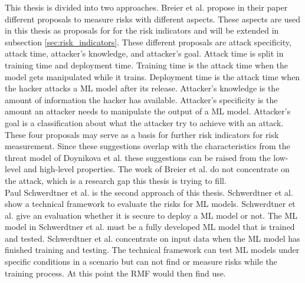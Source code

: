 This thesis is divided into two approaches. Breier et al. \cite{DBLP:journals/corr/abs-2012-04884} propose in their paper different proposals to measure risks with different
aspects. These aspects are used in this thesis as proposals for for the risk indicators and will be extended in subsection \ref{sec:risk_indicators}. These different proposals are attack specificity, attack time, attacker's knowledge, and attacker's goal. Attack time is split in training time and deployment time. Training time is the attack time when the model gets manipulated while it trains. Deployment time is the attack time when the hacker attacks a ML model after its release. Attacker's knowledge is the amount of information the hacker has available. Attacker's specificity is the amount an attacker needs to manipulate the output of a
ML model. Attacker's goal is a classification about what the attacker try to achieve with an attack. These four proposals may serve as a basis for further risk indicators for risk measurement. Since these suggestions overlap with the characteristics from the threat model of Doynikova et al. these suggestions can be raised from the low-level and high-level properties. The work of Breier et al. do not concentrate on the attack, which is a research gap this thesis is trying to fill.  \\
Paul Schwerdtner et al. \cite{DBLP:journals/corr/abs-2011-04328} is the second approach of this thesis. Schwerdtner et al. show a technical framework to evaluate the risks for ML models.
Schwerdtner et al. give an evaluation whether it is secure to deploy a ML model or not. The ML model in Schwerdtner et al. must be a fully developed ML model that is trained and tested.
Schwerdtner et al. concentrate on input data when the ML model has finished training and testing. The technical framework can test ML models under specific conditions in a scenario but can not find or measure risks while the training process. At this point the RMF would then find use.\\
